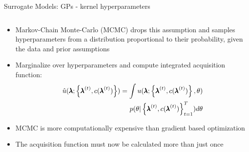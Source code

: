 \begin{frame}[c]{Surrogate Models: GPs - kernel hyperparameters}

\begin{columns}[T] %
\begin{column}{.58\textwidth}
\begin{itemize}
    \item<1-4> Markov-Chain Monte-Carlo (MCMC) drops this assumption and samples hyperparameters from a distribution proportional to their probability, given the data and prior assumptions
    \item<2-4> Marginalize over hyperparameters and compute integrated acquisition function:
        \begin{equation*}
        \begin{aligned}
            \hat{u} ( \pmb{\lambda}; \left \{ {\pmb{\lambda}}^{(t)}, c({{\pmb{\lambda}}^{(t)}}) \right \} ) = \int u ( \pmb{\lambda}; \left \{ {\pmb{\lambda}}^{(t)}, c({{\pmb{\lambda}}^{(t)}}) \right \}, \theta ) \\ 
            p(\theta  \rvert \left \{ {\pmb{\lambda}}^{(t)}, c({{\pmb{\lambda}}^{(t)}}) \right \}^{T}_{t=1} )d\theta
        \end{aligned}
        \end{equation*}
    \item<3-4> MCMC is more computationally expensive than gradient based optimization
    \item<4-4>The acquisition function must now be calculated more than just once
\end{itemize}
\end{column}%

\hfill%


\end{columns}
\end{frame}
